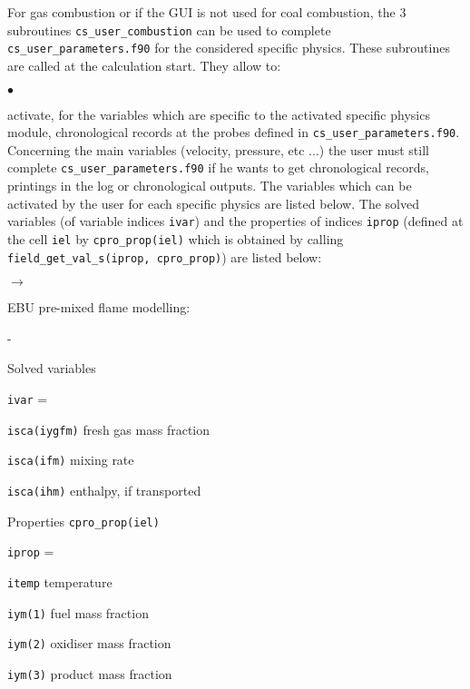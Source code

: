 {{{For gas combustion or if the GUI is not used for coal combustion, the 3
subroutines \texttt{cs\_user\_combustion} can be used to complete
\texttt{cs\_user\_parameters.f90} for the considered specific physics. These
subroutines are called at the calculation start.
They allow to:
\begin{list}{$\bullet$}{}
\item activate, for the variables which are specific to the activated specific
      physics module, chronological records at the probes defined in
      \texttt{cs\_user\_parameters.f90}.\\
      Concerning the main variables (velocity, pressure, etc ...) the user
      must still complete \texttt{cs\_user\_parameters.f90} if he wants to get
      chronological records, printings in the log or chronological
      outputs.
      The variables which can be activated by the user for each specific
      physics are listed below. The solved variables (of variable indices
      \texttt{ivar}) and the properties of indices \texttt{iprop} (defined at
      the cell \texttt{iel} by \texttt{cpro\_prop(iel)} which is obtained
      by calling \texttt{field\_get\_val\_s(iprop, cpro\_prop)})
      are listed below:
      \begin{list}{$\rightarrow$}{}
       \item EBU pre-mixed flame modelling:
       \begin{list}{-}{}
        \item Solved variables
              \begin{list}{\texttt{ivar} = }{}
               \item \texttt{isca(iygfm)} fresh gas mass fraction
               \item \texttt{isca(ifm)} mixing rate
               \item \texttt{isca(ihm)} enthalpy, if transported
              \end{list}
        \item Properties \texttt{cpro\_prop(iel)}
              \begin{list}{\texttt{iprop} = }{}
               \item \texttt{itemp} temperature
               \item \texttt{iym(1)} fuel mass fraction
               \item \texttt{iym(2)} oxidiser mass fraction
               \item \texttt{iym(3)} product mass fraction

\end{list}
\end{list}
\end{list}
\end{list}}}}
